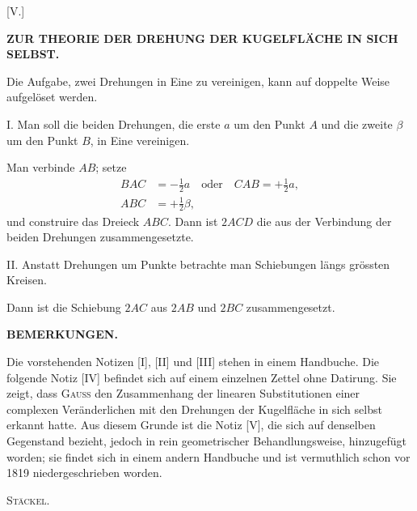 \clearpage
\begin{center}[V.]\end{center}
\begin{center}\bfseries ZUR THEORIE DER DREHUNG DER KUGELFLÄCHE IN SICH SELBST.\end{center}

Die Aufgabe, zwei Drehungen in Eine zu vereinigen, kann auf doppelte Weise aufgelöset werden.

I. Man soll die beiden Drehungen, die erste $a$ um den Punkt $A$ und die zweite $\beta$ um den Punkt $B$, in Eine vereinigen.

\begin{center}
\begin{minipage}{4.4cm}\end{minipage}\hfill
\begin{minipage}{8.1cm}\raggedright
Man verbinde $AB$; setze
\[
\begin{aligned}
BAC&=-\tfrac12a\quad\text{oder}\quad CAB=+\tfrac12a,\\
ABC&=+\tfrac12\beta,
\end{aligned}
\]
und construire das Dreieck $ABC$. Dann ist $2ACD$ die aus der Verbindung der beiden Drehungen zusammengesetzte.
\end{minipage}
\end{center}

\begin{center}\end{center}
II. Anstatt Drehungen um Punkte betrachte man Schiebungen längs grössten Kreisen.

Dann ist die Schiebung $2AC$ aus $2AB$ und $2BC$ zusammengesetzt.

\begin{center}\bfseries BEMERKUNGEN.\end{center}

Die vorstehenden Notizen [I], [II] und [III] stehen in einem Handbuche. Die folgende Notiz [IV] befindet sich auf einem einzelnen Zettel ohne Datirung. Sie zeigt, dass \textsc{Gauss} den Zusammenhang der linearen Substitutionen einer complexen Veränderlichen mit den Drehungen der Kugelfläche in sich selbst erkannt hatte. Aus diesem Grunde ist die Notiz [V], die sich auf denselben Gegenstand bezieht, jedoch in rein geometrischer Behandlungsweise, hinzugefügt worden; sie findet sich in einem andern Handbuche und ist vermuthlich schon vor 1819 niedergeschrieben worden.
\begin{flushright}\textsc{Stäckel.}\end{flushright}
